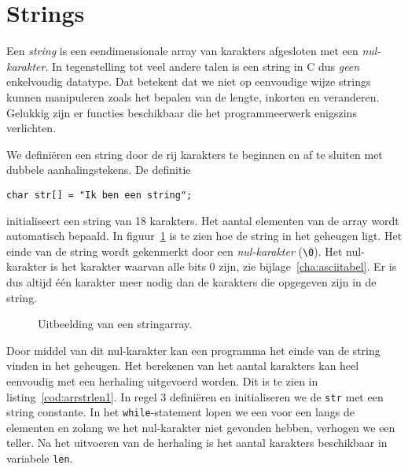 \section{Strings}
Een \textsl{string} is een eendimensionale array van karakters afgesloten met een \textsl{nul-karakter}. In tegenstelling tot veel andere talen is een string in C dus \textsl{geen} enkelvoudig datatype. Dat betekent dat we niet op eenvoudige wijze strings kunnen manipuleren zoals het bepalen van de lengte, inkorten en veranderen. Gelukkig zijn er functies beschikbaar die het programmeerwerk enigszins verlichten. 

We definiëren een string door de rij karakters te beginnen en af te sluiten met dubbele aanhalingstekens. De definitie

\begin{lstlisting}[style=lstoneline]
char str[] = "Ik ben een string";
\end{lstlisting}

initialiseert een string van 18 karakters. Het aantal elementen van de array wordt automatisch bepaald.
In figuur~\ref{fig:arrastring} is te zien hoe de string in het geheugen ligt. Het einde van de string wordt gekenmerkt door een \textsl{nul-karakter} (\texttt{\textbackslash 0}). Het nul-karakter is het karakter waarvan alle bits 0 zijn, zie bijlage~\ref{cha:asciitabel}. Er is dus altijd één karakter meer nodig dan de karakters die opgegeven zijn in de string.

\begin{figure}[H]
\centering
{}
\caption{Uitbeelding van een stringarray.}
\label{fig:arrastring}
\end{figure}

Door middel van dit nul-karakter kan een programma het einde van de string vinden in het geheugen. Het berekenen van het aantal karakters kan heel eenvoudig met een herhaling uitgevoerd worden. Dit is te zien in listing~\ref{cod:arrstrlen1}. In regel 3 definiëren en initialiseren we de \texttt{str} met een string constante. In het \texttt{while}-statement lopen we een voor een langs de elementen en zolang we het nul-karakter niet gevonden hebben, verhogen we een teller. Na het uitvoeren van de herhaling is het aantal karakters beschikbaar in variabele \texttt{len}.

